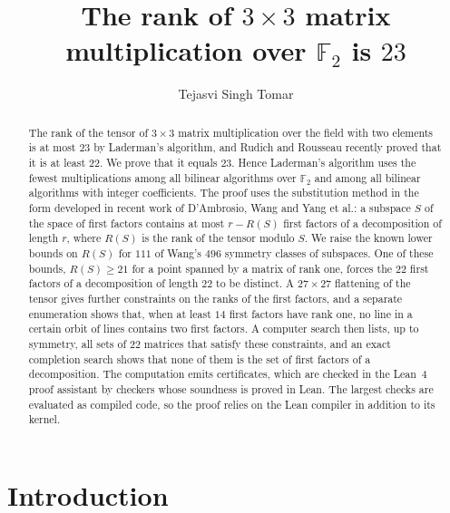 \documentclass[11pt]{amsart}
\theoremstyle{definition}
\theoremstyle{remark}
\numberwithin{equation}{section}
\newcommand{\F}{\mathbb{F}_2}
\begin{document}
\title{The rank of $3\times 3$ matrix multiplication over $\F$ is $23$}
\author{Tejasvi Singh Tomar}
\address{Independent researcher}
\renewcommand{\urladdrname}{{\itshape ORCID}}

\begin{abstract}
The rank of the tensor of $3\times 3$ matrix multiplication over the field with two elements is at most $23$ by Laderman's algorithm, and Rudich and Rousseau recently proved that it is at least $22$. We prove that it equals $23$. Hence Laderman's algorithm uses the fewest multiplications among all bilinear algorithms over $\F$ and among all bilinear algorithms with integer coefficients. The proof uses the substitution method in the form developed in recent work of D'Ambrosio, Wang and Yang et al.: a subspace $S$ of the space of first factors contains at most $r-R(S)$ first factors of a decomposition of length $r$, where $R(S)$ is the rank of the tensor modulo $S$. We raise the known lower bounds on $R(S)$ for $111$ of Wang's $496$ symmetry classes of subspaces. One of these bounds, $R(S)\ge 21$ for a point spanned by a matrix of rank one, forces the $22$ first factors of a decomposition of length $22$ to be distinct. A $27\times 27$ flattening of the tensor gives further constraints on the ranks of the first factors, and a separate enumeration shows that, when at least $14$ first factors have rank one, no line in a certain orbit of lines contains two first factors. A computer search then lists, up to symmetry, all sets of $22$ matrices that satisfy these constraints, and an exact completion search shows that none of them is the set of first factors of a decomposition. The computation emits certificates, which are checked in the Lean~4 proof assistant by checkers whose soundness is proved in Lean. The largest checks are evaluated as compiled code, so the proof relies on the Lean compiler in addition to its kernel.
\end{abstract}

\maketitle

\section{Introduction}\label{sec:intro}
\end{document}
